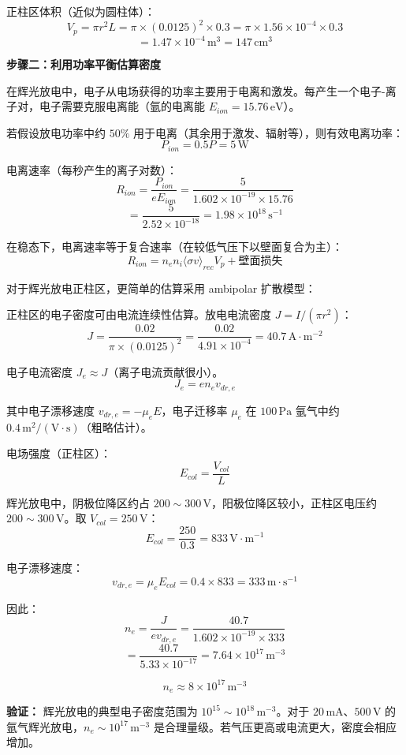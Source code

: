 正柱区体积（近似为圆柱体）：
\[
    V_p = \pi r^2 L = \pi \times (0.0125)^2 \times 0.3 = \pi \times 1.56\times10^{-4} \times 0.3
\]
\[
    = 1.47\times10^{-4}\,\mathrm{m^3} = 147\,\mathrm{cm^3}
\]

\textbf{步骤二：利用功率平衡估算密度}

在辉光放电中，电子从电场获得的功率主要用于电离和激发。每产生一个电子-离子对，电子需要克服电离能（氩的电离能 $E_{ion} = 15.76\,\mathrm{eV}$）。

若假设放电功率中约 $50\%$ 用于电离（其余用于激发、辐射等），则有效电离功率：
\[
    P_{ion} = 0.5 P = 5\,\mathrm{W}
\]

电离速率（每秒产生的离子对数）：
\[
    R_{ion} = \frac{P_{ion}}{e E_{ion}} = \frac{5}{1.602\times10^{-19} \times 15.76}
\]
\[
    = \frac{5}{2.52\times10^{-18}} = 1.98\times10^{18}\,\mathrm{s^{-1}}
\]

在稳态下，电离速率等于复合速率（在较低气压下以壁面复合为主）：
\[
    R_{ion} = n_e n_i \langle\sigma v\rangle_{rec} V_p + \text{壁面损失}
\]

对于辉光放电正柱区，更简单的估算采用 ambipolar 扩散模型：

正柱区的电子密度可由电流连续性估算。放电电流密度 $J = I / (\pi r^2)$：
\[
    J = \frac{0.02}{\pi \times (0.0125)^2} = \frac{0.02}{4.91\times10^{-4}} = 40.7\,\mathrm{A\cdot m^{-2}}
\]

电子电流密度 $J_e \approx J$（离子电流贡献很小）。
\[
    J_e = e n_e v_{dr,e}
\]

其中电子漂移速度 $v_{dr,e} = -\mu_e E$，电子迁移率 $\mu_e$ 在 $100\,\mathrm{Pa}$ 氩气中约 $0.4\,\mathrm{m^2/(V\cdot s)}$（粗略估计）。

电场强度（正柱区）：
\[
    E_{col} = \frac{V_{col}}{L}
\]

辉光放电中，阴极位降区约占 $200\sim300\,\mathrm{V}$，阳极位降区较小，正柱区电压约 $200\sim300\,\mathrm{V}$。取 $V_{col} = 250\,\mathrm{V}$：
\[
    E_{col} = \frac{250}{0.3} = 833\,\mathrm{V\cdot m^{-1}}
\]

电子漂移速度：
\[
    v_{dr,e} = \mu_e E_{col} = 0.4 \times 833 = 333\,\mathrm{m\cdot s^{-1}}
\]

因此：
\[
    n_e = \frac{J}{e v_{dr,e}} = \frac{40.7}{1.602\times10^{-19} \times 333}
\]
\[
    = \frac{40.7}{5.33\times10^{-17}} = 7.64\times10^{17}\,\mathrm{m^{-3}}
\]

\[
    \boxed{n_e \approx 8\times10^{17}\,\mathrm{m^{-3}}}
\]

\textbf{验证：} 辉光放电的典型电子密度范围为 $10^{15}\sim10^{18}\,\mathrm{m^{-3}}$。对于 $20\,\mathrm{mA}$、$500\,\mathrm{V}$ 的氩气辉光放电，$n_e\sim 10^{17}\,\mathrm{m^{-3}}$ 是合理量级。若气压更高或电流更大，密度会相应增加。

